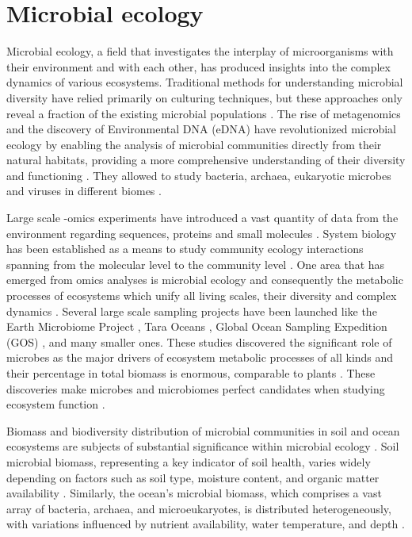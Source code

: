 \section{Microbial ecology}
\label{sec:microbial_ecology}

Microbial ecology, a field that investigates the interplay of microorganisms with
their environment and with each other, has produced insights into
the complex dynamics of various ecosystems.
Traditional methods for understanding microbial diversity have relied primarily
on culturing techniques, but these approaches only reveal a fraction of the
existing microbial populations \parencite{prosser2020Conceptual}.
The rise of metagenomics and the discovery of
Environmental DNA (eDNA) have revolutionized microbial ecology by enabling the
analysis of microbial communities directly from their natural habitats,
providing a more comprehensive understanding of their diversity and
functioning \parencite{raes2008Molecular}. They allowed to 
study bacteria, archaea, eukaryotic microbes and viruses in different biomes \parencite{nayfach2021a-genomic}.

Large scale -omics experiments have introduced a vast quantity of data from the
environment regarding sequences, proteins and small molecules \parencite{shaffer2022Standardized}.
System biology has been established as a means to study community ecology interactions spanning
from the molecular level to the community level \parencite{raes2008Molecular}.
One area that has emerged from omics analyses is microbial ecology and
consequently the metabolic processes of ecosystems \parencite{perez_garcia2016Metabolic}
which unify all living scales, their diversity and complex dynamics \parencite{smith2016Origin}.
Several large scale sampling projects have been launched like the Earth
Microbiome Project \parencite{thompson2017a-communal}, Tara Oceans \parencite{sunagawa2020tara},
Global Ocean Sampling Expedition (GOS) \parencite{Shibu2007}, and
many smaller ones. These studies discovered the significant role of microbes as the major drivers of ecosystem metabolic
processes of all kinds \parencite{falkowski2008microbial,hall2018understanding} and
their percentage in total biomass is enormous, comparable to plants \parencite{bar2018biomass}.
These discoveries make microbes and microbiomes perfect candidates when
studying ecosystem function \parencite{klitgord2011Ecosystems,widder2016Challenges}.

Biomass and biodiversity distribution of microbial communities in soil and ocean
ecosystems are subjects of substantial significance within microbial ecology \parencite{bar2018biomass}.
Soil microbial biomass, representing a key indicator of soil health, varies
widely depending on factors such as soil type, moisture content, and organic
matter availability \parencite{Crowther2019}. Similarly, the ocean's
microbial biomass, which comprises a vast array of bacteria, archaea, and
microeukaryotes, is distributed heterogeneously, with variations influenced by
nutrient availability, water temperature, and depth \parencite{loucaDecouplingFunctionTaxonomy2016}.

